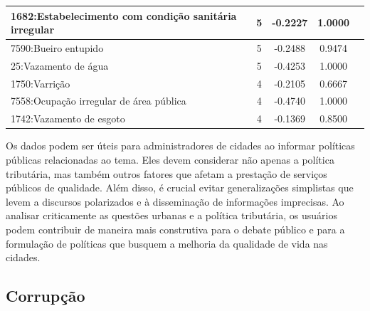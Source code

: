 \begin{table}[htbp]
\begin{tabular}{|l|c|c|c|c|}
		\hline
		1682:Estabelecimento com condição sanitária irregular & 5                & -0.2227        & 1.0000           \\
		\hline
		7590:Bueiro entupido                                  & 5                & -0.2488        & 0.9474           \\
		\hline
		25:Vazamento de água                                  & 5                & -0.4253        & 1.0000           \\
		\hline
		1750:Varrição                                         & 4                & -0.2105        & 0.6667           \\
		\hline
		7558:Ocupação irregular de área pública               & 4                & -0.4740        & 1.0000           \\
		\hline
		1742:Vazamento de esgoto                              & 4                & -0.1369        & 0.8500           \\
		\hline
	\end{tabular}
\end{table}

Os dados podem ser úteis para administradores de cidades ao informar políticas públicas relacionadas ao tema. Eles devem considerar não apenas a política tributária, mas também outros fatores que afetam a prestação de serviços públicos de qualidade. Além disso, é crucial evitar generalizações simplistas que levem a discursos polarizados e à disseminação de informações imprecisas. Ao analisar criticamente as questões urbanas e a política tributária, os usuários podem contribuir de maneira mais construtiva para o debate público e para a formulação de políticas que busquem a melhoria da qualidade de vida nas cidades.

\subsection{Corrupção}

